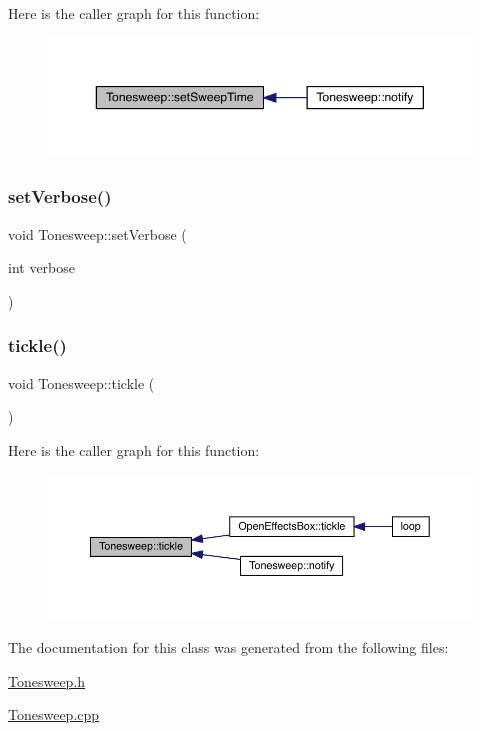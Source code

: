 Here is the caller graph for this function\+:\nopagebreak
\begin{figure}[H]
\begin{center}
\leavevmode
\includegraphics[width=350pt]{class_tonesweep_af9a80c36bb303972c91fe12cddcb1a49_icgraph}
\end{center}
\end{figure}
\mbox{\label{class_tonesweep_aff2c8c7535cffc8b273bc6c24c3199f4}} 
\subsubsection{\texorpdfstring{set\+Verbose()}{setVerbose()}}
{\footnotesize\ttfamily void Tonesweep\+::set\+Verbose (\begin{DoxyParamCaption}\item[{int}]{verbose }\end{DoxyParamCaption})}

\mbox{\label{class_tonesweep_a7b07248587a39ca50a852c38912512ec}} 
\subsubsection{\texorpdfstring{tickle()}{tickle()}}
{\footnotesize\ttfamily void Tonesweep\+::tickle (\begin{DoxyParamCaption}{ }\end{DoxyParamCaption})}

Here is the caller graph for this function\+:\nopagebreak
\begin{figure}[H]
\begin{center}
\leavevmode
\includegraphics[width=350pt]{class_tonesweep_a7b07248587a39ca50a852c38912512ec_icgraph}
\end{center}
\end{figure}


The documentation for this class was generated from the following files\+:\begin{DoxyCompactItemize}
\item 
\mbox{\hyperlink{_tonesweep_8h}{Tonesweep.\+h}}\item 
\mbox{\hyperlink{_tonesweep_8cpp}{Tonesweep.\+cpp}}\end{DoxyCompactItemize}
